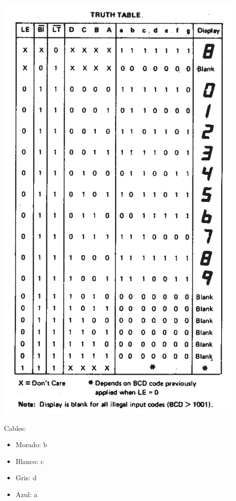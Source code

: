 \begin{table}[h!]
    \centering
    \begin{minipage}{0.5\textwidth}
        \centering
        \includegraphics[width=\textwidth]{./imagenes/tabla.png}
    \end{minipage}%
    \begin{minipage}{0.5\textwidth}
        Cables:
        \begin{itemize}
            \setlength\itemsep{0.1em} %
            \item Morado: b
            \item Blanco: c
            \item Gris: d
            \item Azul: a
        \end{itemize}


\end{minipage}
\end{table}

